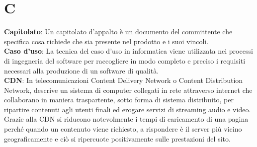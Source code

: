 \section{C}
\textbf{Capitolato}: Un capitolato d’appalto è un documento del committente che specifica cosa richiede che
sia presente nel prodotto e i suoi vincoli.\\
\textbf{Caso d'uso}: La tecnica del caso d'uso in informatica viene utilizzata nei processi di ingegneria del software per raccogliere in modo completo e preciso i requisiti necessari alla produzione di un software di qualità.\\
\textbf{CDN}: In telecomunicazioni Content Delivery Network o Content Distribution Network, descrive un sistema di computer collegati in rete attraverso internet che collaborano in maniera traspartente, sotto forma di sistema distribuito, per ripartire contenuti  agli utenti finali ed erogare servizi di streaming audio e video. Grazie alla CDN si riducono notevolmente i tempi di caricamento di una pagina perché quando un contenuto viene richiesto, a rispondere è il server più vicino geograficamente e ciò si ripercuote positivamente sulle prestazioni del sito.\\  
